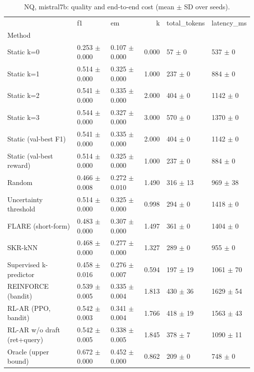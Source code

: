 \begin{table}
\caption{NQ, mistral7b: quality and end-to-end cost (mean $\pm$ SD over seeds).}
\begin{tabular}{lllrll}
\toprule
 & f1 & em & k & total_tokens & latency_ms \\
Method &  &  &  &  &  \\
\midrule
Static k=0 & 0.253 $\pm$ 0.000 & 0.107 $\pm$ 0.000 & 0.000 & 57 $\pm$ 0 & 537 $\pm$ 0 \\
Static k=1 & 0.514 $\pm$ 0.000 & 0.325 $\pm$ 0.000 & 1.000 & 237 $\pm$ 0 & 884 $\pm$ 0 \\
Static k=2 & 0.541 $\pm$ 0.000 & 0.335 $\pm$ 0.000 & 2.000 & 404 $\pm$ 0 & 1142 $\pm$ 0 \\
Static k=3 & 0.544 $\pm$ 0.000 & 0.327 $\pm$ 0.000 & 3.000 & 570 $\pm$ 0 & 1370 $\pm$ 0 \\
Static (val-best F1) & 0.541 $\pm$ 0.000 & 0.335 $\pm$ 0.000 & 2.000 & 404 $\pm$ 0 & 1142 $\pm$ 0 \\
Static (val-best reward) & 0.514 $\pm$ 0.000 & 0.325 $\pm$ 0.000 & 1.000 & 237 $\pm$ 0 & 884 $\pm$ 0 \\
Random & 0.466 $\pm$ 0.008 & 0.272 $\pm$ 0.010 & 1.490 & 316 $\pm$ 13 & 969 $\pm$ 38 \\
Uncertainty threshold & 0.514 $\pm$ 0.000 & 0.325 $\pm$ 0.000 & 0.998 & 294 $\pm$ 0 & 1418 $\pm$ 0 \\
FLARE (short-form) & 0.483 $\pm$ 0.000 & 0.307 $\pm$ 0.000 & 1.497 & 361 $\pm$ 0 & 1404 $\pm$ 0 \\
SKR-kNN & 0.468 $\pm$ 0.000 & 0.277 $\pm$ 0.000 & 1.327 & 289 $\pm$ 0 & 955 $\pm$ 0 \\
Supervised k-predictor & 0.458 $\pm$ 0.016 & 0.276 $\pm$ 0.007 & 0.594 & 197 $\pm$ 19 & 1061 $\pm$ 70 \\
REINFORCE (bandit) & 0.539 $\pm$ 0.005 & 0.335 $\pm$ 0.004 & 1.813 & 430 $\pm$ 36 & 1629 $\pm$ 54 \\
RL-AR (PPO, bandit) & 0.542 $\pm$ 0.003 & 0.341 $\pm$ 0.004 & 1.766 & 418 $\pm$ 19 & 1563 $\pm$ 43 \\
RL-AR w/o draft (ret+query) & 0.542 $\pm$ 0.005 & 0.338 $\pm$ 0.005 & 1.845 & 378 $\pm$ 7 & 1090 $\pm$ 11 \\
Oracle (upper bound) & 0.672 $\pm$ 0.000 & 0.452 $\pm$ 0.000 & 0.862 & 209 $\pm$ 0 & 748 $\pm$ 0 \\
\bottomrule
\end{tabular}
\end{table}
